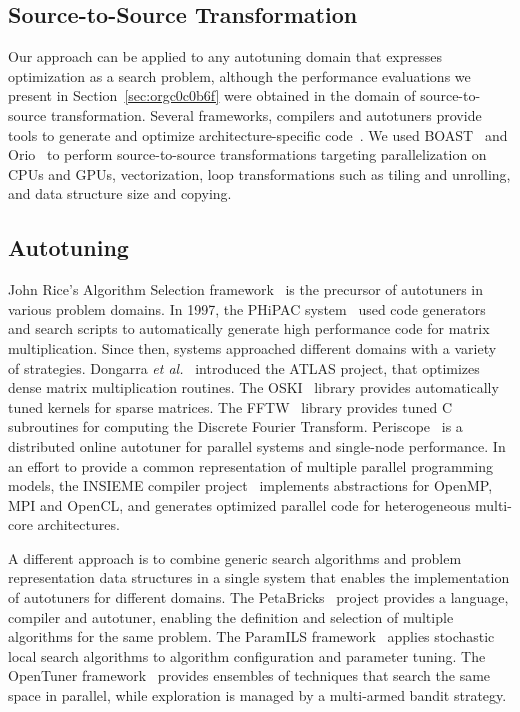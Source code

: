 \documentclass[conference]{IEEEtran}
\begin{document}
\subsection{Source-to-Source Transformation}
\label{sec:org71c80c0}
Our approach can be applied to any autotuning domain that expresses optimization
as a search problem, although the performance evaluations we present in
Section~\ref{sec:orgc0c0b6f} were obtained in the domain of
source-to-source transformation. Several frameworks, compilers and autotuners
provide tools to generate and optimize architecture-specific
code~\cite{hartono2009annotation,videau2017boast,tiwari2009scalable,yi2007poet,ansel2009petabricks}.
We used BOAST~\cite{videau2017boast} and
Orio~\cite{hartono2009annotation} to perform source-to-source
transformations targeting parallelization on CPUs and GPUs, vectorization, loop
transformations such as tiling and unrolling, and data structure size and
copying.
\subsection{Autotuning}
\label{sec:orgdfe93f2}
John Rice's Algorithm Selection framework~\cite{rice1976algorithm} is the
precursor of autotuners in various problem domains. In 1997, the PHiPAC
system~\cite{bilmes1997optimizing} used code generators and search scripts
to automatically generate high performance code for matrix multiplication. Since
then, systems approached different domains with a variety of strategies.
Dongarra \emph{et al.}~\cite{dongarra1998automatically} introduced the ATLAS
project, that optimizes dense matrix multiplication routines. The
OSKI~\cite{vuduc2005oski} library provides automatically tuned kernels for
sparse matrices. The FFTW~\cite{frigo1998fftw} library provides tuned C
subroutines for computing the Discrete Fourier Transform.
Periscope~\cite{gerndt2010automatic} is a distributed online autotuner for
parallel systems and single-node performance. In an effort to provide a common
representation of multiple parallel programming models, the INSIEME compiler
project~\cite{jordan2012multi} implements abstractions for OpenMP, MPI and
OpenCL, and generates optimized parallel code for heterogeneous multi-core
architectures.

A different approach is to combine generic search algorithms and problem
representation data structures in a single system that enables the
implementation of autotuners for different domains. The
PetaBricks~\cite{ansel2009petabricks} project provides a language,
compiler and autotuner, enabling the definition and selection of multiple
algorithms for the same problem. The ParamILS
framework~\cite{hutter2009paramils} applies stochastic local search
algorithms to algorithm configuration and parameter tuning. The OpenTuner
framework~\cite{ansel2014opentuner} provides ensembles of techniques that
search the same space in parallel, while exploration is managed by a multi-armed
bandit strategy.
\end{document}
